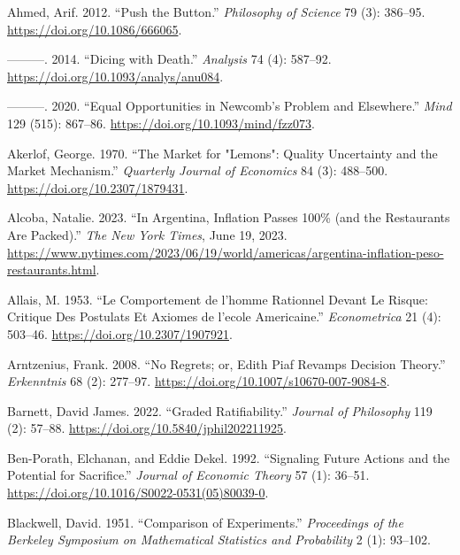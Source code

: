 \documentclass[
  12pt,
  letterpaper,
  DIV=11,
  numbers=noendperiod]{scrreprt}
\newlength{\cslhangindent}
\newenvironment{CSLReferences}[2] %
 {\begin{list}{}{%
  \setlength{\itemindent}{0pt}
  \setlength{\leftmargin}{0pt}
  \setlength{\parsep}{0pt}
  \ifodd #1
   \setlength{\leftmargin}{\cslhangindent}
   \setlength{\itemindent}{-1\cslhangindent}
  \fi
  \setlength{\itemsep}{#2\baselineskip}}}
 {\end{list}}
\begin{document}
\label{refs}
\begin{CSLReferences}{1}{0}
Ahmed, Arif. 2012. {``Push the Button.''} \emph{Philosophy of Science}
79 (3): 386--95. \url{https://doi.org/10.1086/666065}.

---------. 2014. {``Dicing with Death.''} \emph{Analysis} 74 (4):
587--92. \url{https://doi.org/10.1093/analys/anu084}.

---------. 2020. {``Equal Opportunities in Newcomb's Problem and
Elsewhere.''} \emph{Mind} 129 (515): 867--86.
\url{https://doi.org/10.1093/mind/fzz073}.

Akerlof, George. 1970. {``The Market for "Lemons": Quality Uncertainty
and the Market Mechanism.''} \emph{Quarterly Journal of Economics} 84
(3): 488--500. \url{https://doi.org/10.2307/1879431}.

Alcoba, Natalie. 2023. {``In Argentina, Inflation Passes 100\% (and the
Restaurants Are Packed).''} \emph{The New York Times}, June 19, 2023.
\url{https://www.nytimes.com/2023/06/19/world/americas/argentina-inflation-peso-restaurants.html}.

Allais, M. 1953. {``Le Comportement de l'homme Rationnel Devant Le
Risque: Critique Des Postulats Et Axiomes de l'ecole Americaine.''}
\emph{Econometrica} 21 (4): 503--46.
\url{https://doi.org/10.2307/1907921}.

Arntzenius, Frank. 2008. {``No Regrets; or, Edith Piaf Revamps Decision
Theory.''} \emph{Erkenntnis} 68 (2): 277--97.
\url{https://doi.org/10.1007/s10670-007-9084-8}.

Barnett, David James. 2022. {``Graded Ratifiability.''} \emph{Journal of
Philosophy} 119 (2): 57--88.
\url{https://doi.org/10.5840/jphil202211925}.

Ben-Porath, Elchanan, and Eddie Dekel. 1992. {``Signaling Future Actions
and the Potential for Sacrifice.''} \emph{Journal of Economic Theory} 57
(1): 36--51. \url{https://doi.org/10.1016/S0022-0531(05)80039-0}.

Blackwell, David. 1951. {``Comparison of Experiments.''}
\emph{Proceedings of the Berkeley Symposium on Mathematical Statistics
and Probability} 2 (1): 93--102.


\end{CSLReferences}
\end{document}
